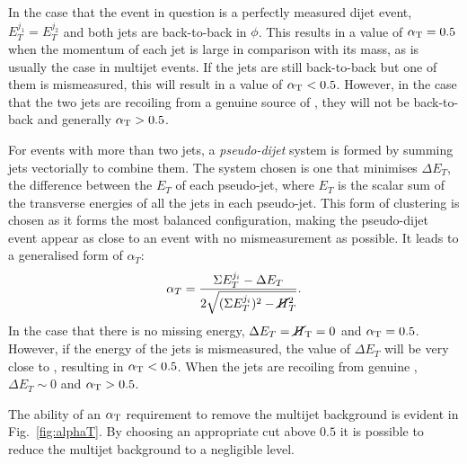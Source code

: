 In the case that the event in question is a perfectly measured dijet
event, $E_T^{j_1}=E_T^{j_2}$ and both jets are back-to-back in $\phi$.
This results in a value of $\alpha_{\text{T}}=0.5$ when the momentum of each jet
is large in comparison with its mass, as is usually the case in
\QCD multijet events. If the jets are still back-to-back but one of
them is mismeasured, this will result in a value of $\alpha_{\text{T}}<0.5$.
However, in the case that the two jets are recoiling from a genuine
source of \MET, they will not be back-to-back and generally $\alpha_{\text{T}}>0.5$.

For events with more than two jets, a \emph{pseudo-dijet} system is
formed by summing jets vectorially to combine them.  The system chosen
is one that minimises $\Delta E_T$, the difference between the $E_T$
of each pseudo-jet, where $E_T$ is the scalar sum of the transverse
energies of all the jets in each pseudo-jet. This form of clustering
is chosen as it forms the most balanced configuration, making the
pseudo-dijet event appear as close to an event with no mismeasurement
as possible. %
It leads to a generalised form of $\alpha_T$: 
\begin{equation}
\alpha_T=\frac{\Sigma E_T^{j_i}-\Delta
E_T}{2\sqrt{(\Sigma E_T^{j_i})^2-\cancel{H}_T^2}}.
\end{equation} 
In the case that there is no missing energy, $\Delta
E_T=\mbox{$\cancel{H}_\text{T}$}=0$ and $\alpha_{\text{T}}=0.5$. However, if the energy of the jets is
mismeasured, the value of $\Delta E_T$ will be very close to \MET,
resulting in $\alpha_{\text{T}}<0.5$. When the jets are recoiling from genuine
\MET, $\Delta E_T\sim 0$ and $\alpha_{\text{T}}>0.5$.
  
The ability of an $\alpha_{\text{T}}$ requirement to remove the \QCD multijet
background is evident in Fig.~\ref{fig:alphaT}. By
choosing an appropriate cut above $0.5$ it is possible to reduce the
multijet background to a negligible level.

